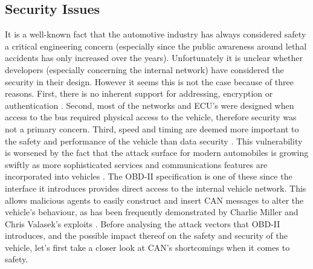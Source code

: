 \subsection{Security Issues}
\label{subsec:obd:security_issues}

It is a well-known fact that the automotive industry has always considered safety a critical engineering concern (especially since the public awareness around lethal accidents has only increased over the years). Unfortunately it is unclear whether developers (especially concerning the internal network) have considered the security in their design. However it seems this is not the case because of three reasons. First, there is no inherent support for addressing, encryption or authentication \cite{MillerB}. Second, most of the networks and ECU's were designed when access to the bus required physical access to the vehicle, therefore security was not a primary concern. Third, speed and timing are deemed more important to the safety and performance of the vehicle than data security \cite{Klinedinst05}. This vulnerability is worsened by the fact that the attack surface for modern automobiles is growing swiftly as more sophisticated services and communications features are incorporated into vehicles \cite{Kosher}. The OBD-II specification is one of these since the interface it introduces provides direct access to the internal vehicle network. This allows malicious agents to easily construct and insert CAN messages to alter the vehicle's behaviour, as has been frequently demonstrated by Charlie Miller and Chris Valasek's exploits \cite{MillerA}\cite{MillerB}\cite{MillerC}. Before analysing the attack vectors that OBD-II introduces, and the possible impact thereof on the safety and security of the vehicle, let's first take a closer look at CAN's shortcomings when it comes to safety.

